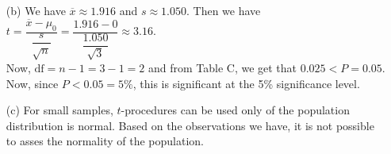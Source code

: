 \documentclass[11pt, a4paper]{article}
\begin{document}
\begin{itemize}
\begin{itemize}
\item[]

\item[(b)]
We have $\overline{x} \approx 1.916$ and $s \approx 1.050$.
Then we have $t = \dfrac{\overline{x} - \mu_0}{\dfrac{s}{\sqrt{n}}} = \dfrac{1.916 - 0}{\dfrac{1.050}{\sqrt{3}}} \approx 3.16$.
\vspace{0.2cm}\\
Now, $\text{df} = n - 1 = 3 - 1 = 2$ and from Table C, we get that $0.025 < P = 0.05$.
Now, since $P < 0.05 = 5\%$, this is significant at the 5\% significance level.

\item[]

\item[(c)]
For small samples, $t$-procedures can be used only of the population distribution is normal.
Based on the observations we have, it is not possible to asses the normality of the population.
\end{itemize}

\end{itemize}
\end{document}

